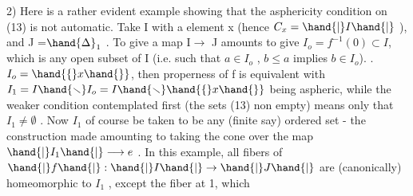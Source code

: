 2)  Here is a rather evident example showing that the asphericity
condition on (13) is not automatic.  Take  I  with a  element x
(hence  $C_{x} = \hand{|}I\hand{|}$ ),  and J =$\hand{\Delta}_{1}$  .  To give
a map  I$\rightarrow$ J  amounts to give  $I_{o} = f^{-1}(0) \subset I$,  which is any open subset
of I (i.e. such that $a \in I_{o}$ ,  $b \leqslant a$  implies $b \in I_{o}$).   
.  $I_{o} = \hand{\{}x\hand{\}}$,  then properness of
f is equivalent with  $I_{1} = I \hand{\smallsetminus} I_{o} = I\hand{\smallsetminus}\hand{\{}x\hand{\}}$ being aspheric,  while the
weaker condition contemplated first (the sets (13) non empty) means only
that $I_{1} \neq \emptyset$ .  Now\hand{\unsure{,}} $I_{1}$  of course be taken to be any (finite say)
ordered set - the construction made amounting to taking the cone over
the map $\hand{|}I_{1}\hand{|} \longrightarrow e$ .   In this example,  all fibers of $\hand{|}f\hand{|} :\hand{|}I\hand{|}\rightarrow\hand{|}J\hand{|}$
are (canonically) homeomorphic to  $I_{1}$  , except the fiber at  1, which

